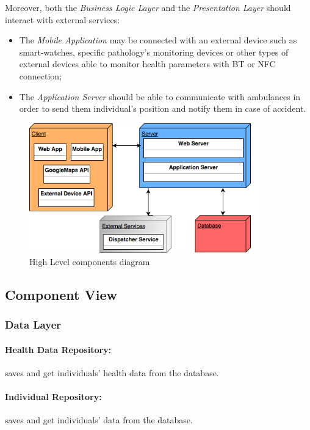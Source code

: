 \documentclass[a4paper]{article}
\begin{document}
Moreover, both the \textit{Business Logic Layer} and the \textit{Presentation Layer} should interact with external services:
\begin{itemize}
    \item The \textit{Mobile Application} may be connected with an external device such as smart-watches, specific pathology's monitoring devices or other types of external devices able to monitor health parameters with BT or NFC connection;
    \item The \textit{Application Server} should be able to communicate with ambulances in order to send them individual's position and notify them in case of accident.
\end{itemize}
\hfill
\begin{figure}[!htpb]
    	\centering
    	\includegraphics[width=100mm,keepaspectratio]{images/highlevel2.png}
    	\caption{High Level components diagram}
\end{figure}
\hfill
\newpage
\subsection{Component View}
    
    \subsubsection{Data Layer}
    
    \paragraph{Health Data Repository:}
    saves and get individuals' health data from the database.
    
    \paragraph{Individual Repository:}
    saves and get individuals' data from the database.
    
\end{document}
